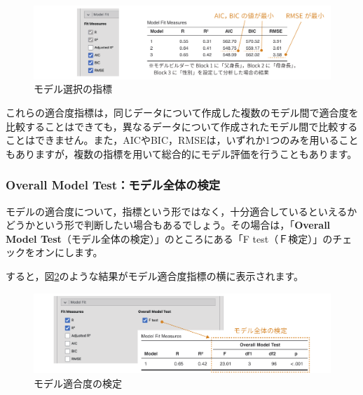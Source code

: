 \documentclass[
  12pt,
  a5jpaper,
  lualatex, ja=standard]{bxjsbook}
\begin{document}
\begin{figure}[!ht]

{\centering \includegraphics[width=1\linewidth]{images/regression/lr-modelfit-aic} 

}

\caption{モデル選択の指標}\label{fig:regression-lr-modelfit-aic}
\end{figure}

これらの適合度指標は，同じデータについて作成した複数のモデル間で適合度を比較することはできても，異なるデータについて作成されたモデル間で比較することはできません。また，AICやBIC，RMSEは，いずれか1つのみを用いることもありますが，複数の指標を用いて総合的にモデル評価を行うこともあります。

\hypertarget{overall-model-testux30e2ux30c7ux30ebux5168ux4f53ux306eux691cux5b9a}{%
\subsubsection*{Overall Model Test：モデル全体の検定}\label{overall-model-testux30e2ux30c7ux30ebux5168ux4f53ux306eux691cux5b9a}}

モデルの適合度について，指標という形ではなく，十分適合しているといえるかどうかという形で判断したい場合もあるでしょう。その場合は，「\textbf{Overall Model Test}（モデル全体の検定）」のところにある「F test（Ｆ検定）」のチェックをオンにします。

すると，図\ref{fig:regression-lr-modelfit-anova}のような結果がモデル適合度指標の横に表示されます。

\begin{figure}[!ht]

{\centering \includegraphics[width=1\linewidth]{images/regression/lr-modelfit-anova} 

}

\caption{モデル適合度の検定}\label{fig:regression-lr-modelfit-anova}
\end{figure}
\end{document}
